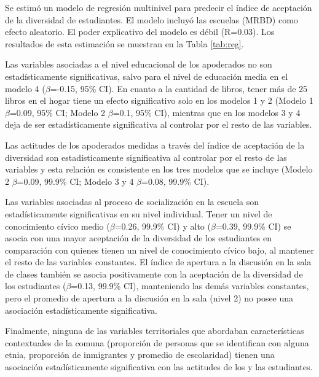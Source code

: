 \documentclass[12pt,twoside]{templates/facsothesis}
\begin{document}
Se estimó un modelo de regresión multinivel para predecir el índice de aceptación de la diversidad de estudiantes. El modelo incluyó las escuelas (MRBD) como efecto aleatorio. El poder explicativo del modelo es débil (R=0.03). Los resultados de esta estimación se muestran en la Tabla \ref{tab:reg}.

Las variables asociadas a el nivel educacional de los apoderados no son estadísticamente significativas, salvo para el nivel de educación media en el modelo 4 (\(\beta\)=-0.15, 95\% CI). En cuanto a la cantidad de libros, tener más de 25 libros en el hogar tiene un efecto significativo solo en los modelos 1 y 2 (Modelo 1 \(\beta\)=0.09, 95\% CI; Modelo 2 \(\beta\)=0.1, 95\% CI), mientras que en los modelos 3 y 4 deja de ser estadísticamente significativa al controlar por el resto de las variables.

Las actitudes de los apoderados medidas a través del índice de aceptación de la diversidad son estadísticamente significativa al controlar por el resto de las variables y esta relación es consistente en los tres modelos que se incluye (Modelo 2 \(\beta\)=0.09, 99.9\% CI; Modelo 3 y 4 \(\beta\)=0.08, 99.9\% CI).

Las variables asociadas al proceso de socialización en la escuela son estadísticamente significativas en su nivel individual. Tener un nivel de conocimiento cívico medio (\(\beta\)=0.26, 99.9\% CI) y alto (\(\beta\)=0.39, 99.9\% CI) se asocia con una mayor aceptación de la diversidad de los estudiantes en comparación con quienes tienen un nivel de conocimiento cívico bajo, al mantener el resto de las variables constantes. El índice de apertura a la discusión en la sala de clases también se asocia positivamente con la aceptación de la diversidad de los estudiantes (\(\beta\)=0.13, 99.9\% CI), manteniendo las demás variables constantes, pero el promedio de apertura a la discusión en la sala (nivel 2) no posee una asociación estadísticamente significativa.

Finalmente, ninguna de las variables territoriales que abordaban características contextuales de la comuna (proporción de personas que se identifican con alguna etnia, proporción de inmigrantes y promedio de escolaridad) tienen una asociación estadísticamente significativa con las actitudes de los y las estudiantes.
\end{document}
